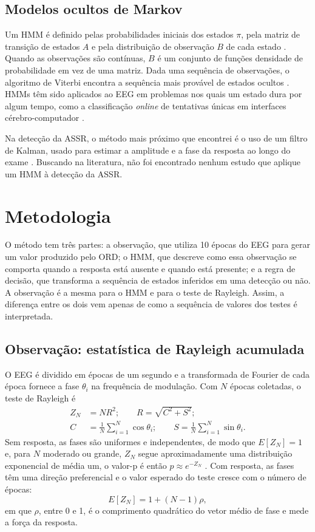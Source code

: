 \documentclass[conference]{IEEEtran}
\begin{document}
\subsection{Modelos ocultos de Markov}

Um HMM é definido pelas probabilidades iniciais dos estados $\pi$, pela matriz de transição de estados $A$ e pela distribuição de observação $B$ de cada estado \cite{rabiner1989}. Quando as observações são contínuas, $B$ é um conjunto de funções densidade de probabilidade em vez de uma matriz. Dada uma sequência de observações, o algoritmo de Viterbi encontra a sequência mais provável de estados ocultos \cite{viterbi1967}. HMMs têm sido aplicados ao EEG em problemas nos quais um estado dura por algum tempo, como a classificação \textit{online} de tentativas únicas em interfaces cérebro-computador \cite{obermaier2001}.

Na detecção da ASSR, o método mais próximo que encontrei é o uso de um filtro de Kalman, usado para estimar a amplitude e a fase da resposta ao longo do exame \cite{luke2017}. Buscando na literatura, não foi encontrado nenhum estudo que aplique um HMM à detecção da ASSR.

\section{Metodologia}

O método tem três partes: a observação, que utiliza 10 épocas do EEG para gerar um valor produzido pelo ORD; o HMM, que descreve como essa observação se comporta quando a resposta está ausente e quando está presente; e a regra de decisão, que transforma a sequência de estados inferidos em uma detecção ou não. A observação é a mesma para o HMM e para o teste de Rayleigh. Assim, a diferença entre os dois vem apenas de como a sequência de valores dos testes é interpretada.

\subsection{Observação: estatística de Rayleigh acumulada}

O EEG é dividido em épocas de um segundo e a transformada de Fourier de cada época fornece a fase $\theta_i$ na frequência de modulação. Com $N$ épocas coletadas, o teste de Rayleigh é
\begin{align}
Z_N &= N R^2; \qquad R=\sqrt{C^2+S^2}; \label{eq:z}\\
C &= \frac{1}{N}\sum_{i=1}^{N}\cos\theta_i; \qquad
S = \frac{1}{N}\sum_{i=1}^{N}\sin\theta_i .
\end{align}
Sem resposta, as fases são uniformes e independentes, de modo que $E[Z_N]=1$ e, para $N$ moderado ou grande, $Z_N$ segue aproximadamente uma distribuição exponencial de média um, o valor-p é então $p\approx e^{-Z_N}$ \cite{mardia2000}. Com resposta, as fases têm uma direção preferencial e o valor esperado do teste cresce com o número de épocas:
\begin{equation}
E[Z_N]=1+(N-1)\rho ,
\label{eq:media}
\end{equation}
em que $\rho$, entre 0 e 1, é o comprimento quadrático do vetor médio de fase e mede a força da resposta.
\end{document}
